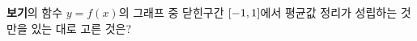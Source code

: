 \textbf{보기}의 함수 $y=f(x)$의 그래프 중 닫힌구간 $[-1{,}\mkern3mu\mathopen{}1]$에서 평균값 정리가 성립하는 것만을 있는 대로 고른 것은?\bogi{\resizebox{\ifdim\width>\linewidth\linewidth\else\width\fi}{!}{}}
